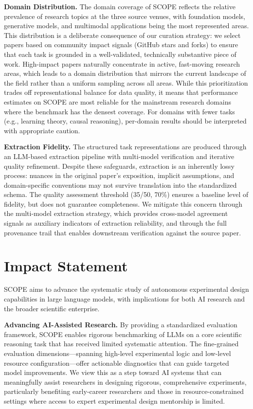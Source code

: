 \textbf{Domain Distribution.} The domain coverage of \textsc{SCOPE} reflects the relative prevalence of research topics at the three source venues, with foundation models, generative models, and multimodal applications being the most represented areas. This distribution is a deliberate consequence of our curation strategy: we select papers based on community impact signals (GitHub stars and forks) to ensure that each task is grounded in a well-validated, technically substantive piece of work. High-impact papers naturally concentrate in active, fast-moving research areas, which leads to a domain distribution that mirrors the current landscape of the field rather than a uniform sampling across all areas. While this prioritization trades off representational balance for data quality, it means that performance estimates on \textsc{SCOPE} are most reliable for the mainstream research domains where the benchmark has the densest coverage. For domains with fewer tasks (e.g., learning theory, causal reasoning), per-domain results should be interpreted with appropriate caution.

\textbf{Extraction Fidelity.} The structured task representations are produced through an LLM-based extraction pipeline with multi-model verification and iterative quality refinement. Despite these safeguards, extraction is an inherently lossy process: nuances in the original paper's exposition, implicit assumptions, and domain-specific conventions may not survive translation into the standardized schema. The quality assessment threshold (35/50, 70\%) ensures a baseline level of fidelity, but does not guarantee completeness. We mitigate this concern through the multi-model extraction strategy, which provides cross-model agreement signals as auxiliary indicators of extraction reliability, and through the full provenance trail that enables downstream verification against the source paper.

\section{Impact Statement}

\textsc{SCOPE} aims to advance the systematic study of autonomous experimental design capabilities in large language models, with implications for both AI research and the broader scientific enterprise.

\textbf{Advancing AI-Assisted Research.} By providing a standardized evaluation framework, \textsc{SCOPE} enables rigorous benchmarking of LLMs on a core scientific reasoning task that has received limited systematic attention. The fine-grained evaluation dimensions---spanning high-level experimental logic and low-level resource configuration---offer actionable diagnostics that can guide targeted model improvements. We view this as a step toward AI systems that can meaningfully assist researchers in designing rigorous, comprehensive experiments, particularly benefiting early-career researchers and those in resource-constrained settings where access to expert experimental design mentorship is limited.


